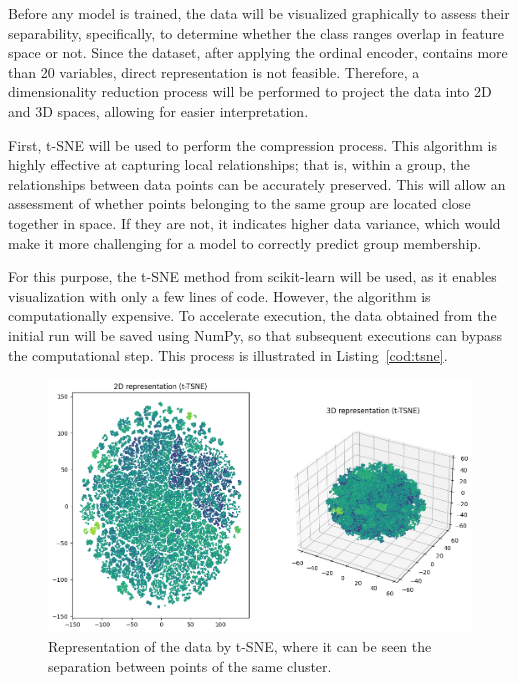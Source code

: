 Before any model is trained, the data will be visualized graphically to assess their separability, specifically, to determine whether the class ranges overlap in feature space or not. Since the dataset, after applying the ordinal encoder, contains more than 20 variables, direct representation is not feasible. Therefore, a dimensionality reduction process will be performed to project the data into 2D and 3D spaces, allowing for easier interpretation.

First, t-SNE \cite{cai2022theoreticalfoundationstsnevisualizing} will be used to perform the compression process. This algorithm is highly effective at capturing local relationships; that is, within a group, the relationships between data points can be accurately preserved. This will allow an assessment of whether points belonging to the same group are located close together in space. If they are not, it indicates higher data variance, which would make it more challenging for a model to correctly predict group membership.

For this purpose, the t-SNE method from scikit-learn \cite{scikit-learn-tsne} will be used, as it enables visualization with only a few lines of code. However, the algorithm is computationally expensive. To accelerate execution, the data obtained from the initial run will be saved using NumPy, so that subsequent executions can bypass the computational step. This process is illustrated in Listing~\ref{cod:tsne}.

\begin{figure}[H]
    \centering
    \includegraphics[width=1\textwidth]{figures/data_representation/tsne.png}
    \caption{Representation of the data by t-SNE, where it can be seen the separation between points of the same cluster.}
    \label{fig:tsne}
\end{figure}

